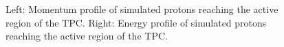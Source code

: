 \begin{figure}[!ht]
  \begin{minipage}[t]{0.48\textwidth}
    \begin{adjustbox}{max totalsize={\textwidth}{.35\textheight}, center}
      
    \end{adjustbox}
  \end{minipage}
  \hspace{0.3cm}
  \begin{minipage}[t]{0.48\textwidth}
    \begin{adjustbox}{max totalsize={\textwidth}{.35\textheight}, center}
      
    \end{adjustbox}
    
  \end{minipage}
  \caption{Left: Momentum profile of simulated protons reaching the active region of the TPC. Right: Energy profile of simulated protons reaching the active region of the TPC.}
  \label{fig:MCTPC}	
\end{figure}
    

